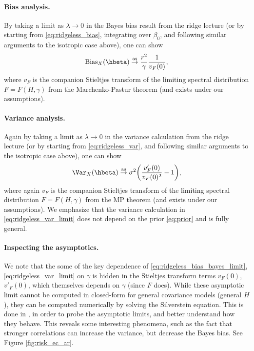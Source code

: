\documentclass{article}
\begin{document}
\paragraph{Bias analysis.}

By taking a limit as $\lambda \to 0$ in the Bayes bias result from the ridge
lecture (or by starting from \eqref{eq:ridgeless_bias}, integrating over
$\beta_0$, and following similar arguments to the isotropic case above),  
one can show  
\begin{equation}
\label{eq:ridgeless_bias_bayes_limit}
\Bias_X(\hbeta) \asto \frac{r^2}{\gamma} \frac{1}{v_F(0)},  
\end{equation}
where $v_F$ is the companion Stieltjes transform of the limiting spectral
distribution $F = F(H, \gamma)$ from the Marchenko-Pastur theorem (and
 exists under our
assumptions).   

\paragraph{Variance analysis.}

Again by taking a limit as $\lambda \to 0$ in the variance calculation from the
ridge lecture (or by starting from \eqref{eq:ridgeless_var}, and following
similar arguments to the isotropic case above), one can show  
\begin{equation}
\label{eq:ridgeless_var_limit}
\Var_X(\hbeta) \asto \sigma^2 \bigg(\frac{v'_F(0)}{v_F(0)^2} - 1 \bigg),
\end{equation}
where again $v_F$ is the companion Stieltjes transform of the limiting spectral 
distribution $F = F(H, \gamma)$ from the MP theorem (and
exists under our assumptions). We emphasize that the variance calculation in 
\eqref{eq:ridgeless_var_limit} does not depend on the prior \eqref{eq:prior} and is
fully general.    

\paragraph{Inspecting the asymptotics.}

We note that the some of the key dependence of
\eqref{eq:ridgeless_bias_bayes_limit}, \eqref{eq:ridgeless_var_limit} on
$\gamma$ is hidden in the Stieltjes transform terms $v_F(0)$, $v'_F(0)$, which
themselves depends on $\gamma$ (since $F$ does). While these asymptotic limit
cannot be computed in closed-form for general covariance models (general $H$),
they can be computed numerically by solving the Silverstein equation. This is
done in \citet{hastie2022surprises}, in order to probe the asymptotic limits,
and better understand how they behave. This reveals some interesting phenomena,
such as  the fact that stronger correlations can increase the variance, but
decrease the Bayes bias. See Figure \ref{fig:risk_ec_ar}.  
\end{document}
